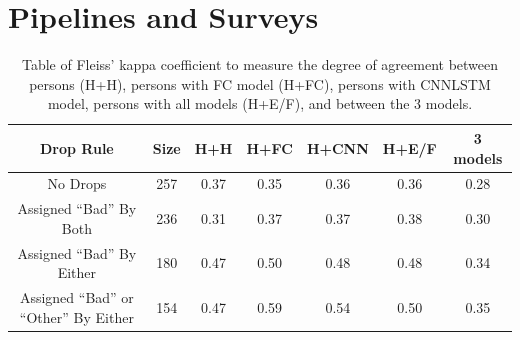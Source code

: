 \documentclass[runningheads,a4paper]{llncs}
\begin{document}
\section{Pipelines and Surveys}
\label{surveys}
\begin{table}
 \begin{tabular}{|c c c c c c c|} 
 \hline
 Drop Rule & Size & H+H & H+FC & H+CNN & H+E/F & 3 models \\ [0.5ex] 
 \hline
 No Drops & 257 &0.37 & 0.35 & 0.36 & 0.36 & 0.28\\ 
 \hline
 Assigned \enquote{Bad} By Both & 236 & 0.31 & 0.37 & 0.37 & 0.38 & 0.30 \\
 \hline
 Assigned \enquote{Bad} By Either & 180 & 0.47 & 0.50 & 0.48 & 0.48 &  0.34 \\
 \hline
 Assigned \enquote{Bad} or \enquote{Other} By Either & 154 & 0.47 & 0.59 & 0.54 & 0.50 &  0.35 \\
 \hline
\end{tabular}
\caption{\label{kappa_table_TPE}Table of Fleiss' kappa coefficient to measure the degree of agreement between persons (H+H), persons with FC model (H+FC), persons with CNNLSTM model, persons with all models (H+E/F), and between the 3 models. }
\end{table}
\end{document}
